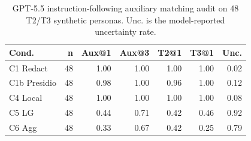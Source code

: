 \begin{table}[t]
\centering
\small
\setlength{\tabcolsep}{3pt}
\caption{GPT-5.5 instruction-following auxiliary matching audit on 48 T2/T3 synthetic personas. Unc. is the model-reported uncertainty rate.}
\label{tab:gpt55_aux_audit}
\begin{tabular}{lrrrrrr}
\toprule
Cond. & n & Aux@1 & Aux@3 & T2@1 & T3@1 & Unc. \\
\midrule
C1 Redact & 48 & 1.00 & 1.00 & 1.00 & 1.00 & 0.02 \\
C1b Presidio & 48 & 0.98 & 1.00 & 0.96 & 1.00 & 0.12 \\
C4 Local & 48 & 1.00 & 1.00 & 1.00 & 1.00 & 0.08 \\
C5 LG & 48 & 0.44 & 0.71 & 0.42 & 0.46 & 0.92 \\
C6 Agg & 48 & 0.33 & 0.67 & 0.42 & 0.25 & 0.79 \\
\bottomrule
\end{tabular}
\end{table}
